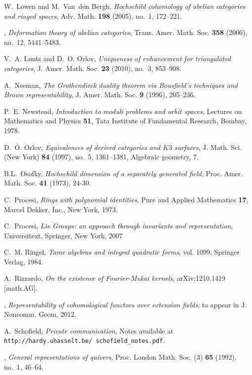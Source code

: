 \documentclass{amsart}
\numberwithin{equation}{section}
\theoremstyle{definition}
\theoremstyle{remark}
\begin{document}
\begin{thebibliography}{10}
W.~Lowen and M.~Van~den Bergh, \emph{Hochschild cohomology of abelian
  categories and ringed spaces}, Adv. Math. \textbf{198} (2005), no.~1,
  172--221.

\bysame, \emph{Deformation theory of abelian categories}, Trans. Amer. Math.
  Soc. \textbf{358} (2006), no.~12, 5441--5483.

V.~A. Lunts and D.~O. Orlov, \emph{Uniqueness of enhancement for triangulated
  categories}, J. Amer. Math. Soc. \textbf{23} (2010), no.~3, 853--908.

A.~Neeman, \emph{The {G}rothendieck duality theorem via {B}ousfield's
  techniques and {B}rown representability}, J. Amer. Math. Soc. \textbf{9}
  (1996), 205--236.

P.~E. Newstead, \emph{Introduction to moduli problems and orbit spaces},
  Lectures on Mathematics and Physics \textbf{51}, Tata Institute of Fundamental
  Research, Bombay, 1978.

D.~O. Orlov, \emph{Equivalences of derived categories and {$K3$} surfaces}, J.
  Math. Sci. (New York) \textbf{84} (1997), no.~5, 1361--1381, Algebraic
  geometry, 7.
 

B.L.~Osofky, {\em Hochschild dimension of a separately generated field}, Proc. Amer. Math. Soc. \textbf{41} (1973), 24-30. 

C.~Procesi, \emph{Rings with polynomial identities}, Pure and Applied Mathematics \textbf{17}, Marcel Dekker, Inc., New York, 1973.

C.~Procesi, \emph{Lie Groups: an approach through invariants and representation},  Universitext. Springer, New York, 2007

C.~M. Ringel, \emph{Tame algebras and integral quadratic forms}, vol. 1099,
  Springer Verlag, 1984.

A.~Rizzardo, \emph{On the existence of {F}ourier-{M}ukai kernels},
  arXiv:1210.1419 [math.AG].

\bysame, \emph{Representability of cohomological functors over extension
  fields}, to appear in J. Noncomm. Geom, 2012.

A.~Schofield, \emph{Private communication}, Notes available at
  \texttt{http://hardy.uhasselt.be/ schofield\_notes.pdf}.

\bysame, \emph{General representations of quivers}, Proc. London Math. Soc. (3)
  \textbf{65} (1992), no.~1, 46--64.


\end{thebibliography}
\end{document}
